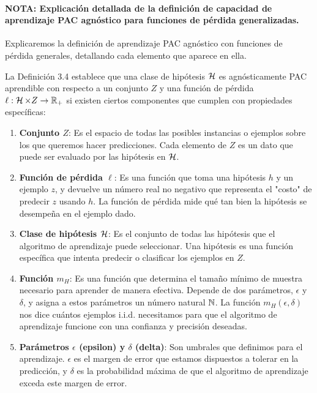 \paragraph{NOTA: Explicación detallada de la definición de capacidad de aprendizaje PAC agnóstico para funciones de pérdida generalizadas.}
Explicaremos la definición de aprendizaje PAC agnóstico con funciones de pérdida generales, detallando cada elemento que aparece en ella.

La Definición 3.4 establece que una clase de hipótesis $\mathop{\mbox{$\mathcal{H}$}}\nolimits$ es agnósticamente PAC aprendible con respecto a un conjunto $Z$ y una función de pérdida $\ell : \mathop{\mbox{$\mathcal{H}$}}\nolimits \times Z \rightarrow \mathbb{R}_+$ si existen ciertos componentes que cumplen con propiedades específicas:

\begin{enumerate}[1.]
    \item \textbf{Conjunto \boldmath $Z$}: Es el espacio de todas las posibles instancias o ejemplos sobre los que queremos hacer predicciones. Cada elemento de $Z$ es un dato que puede ser evaluado por las hipótesis en $\mathop{\mbox{$\mathcal{H}$}}\nolimits$.

    \item \textbf{Función de pérdida \boldmath$\ell$}: Es una función que toma una hipótesis $h$ y un ejemplo $z$, y devuelve un número real no negativo que representa el "costo" de predecir $z$ usando $h$. La función de pérdida mide qué tan bien la hipótesis se desempeña en el ejemplo dado.

    \item \textbf{Clase de hipótesis \boldmath$\mathop{\mbox{$\mathcal{H}$}}\nolimits$}: Es el conjunto de todas las hipótesis que el algoritmo de aprendizaje puede seleccionar. Una hipótesis es una función específica que intenta predecir o clasificar los ejemplos en $Z$.

    \item \textbf{Función \boldmath$m_H$}: Es una función que determina el tamaño mínimo de muestra necesario para aprender de manera efectiva. Depende de dos parámetros, $\epsilon$ y $\delta$, y asigna a estos parámetros un número natural $\mathop{\mbox{$\mathbb{N}$}}\nolimits$. La función $m_H(\epsilon, \delta)$ nos dice cuántos ejemplos i.i.d. necesitamos para que el algoritmo de aprendizaje funcione con una confianza y precisión deseadas.

    \item \textbf{Parámetros \boldmath$ \epsilon $ (epsilon) y $ \delta $ (delta)}: Son umbrales que definimos para el aprendizaje. $ \epsilon $ es el margen de error que estamos dispuestos a tolerar en la predicción, y $ \delta $ es la probabilidad máxima de que el algoritmo de aprendizaje exceda este margen de error.


\end{enumerate}
